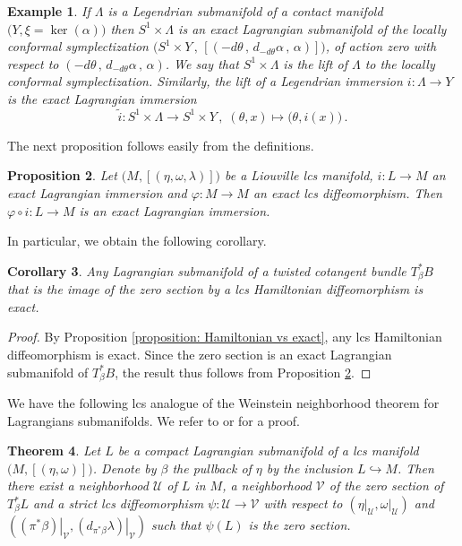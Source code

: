 \documentclass{amsart}
\newtheorem{thm}{Theorem}[section]
\newtheorem{prop}[thm]{Proposition}
\newtheorem{cor}[thm]{Corollary}
\newtheorem{example}[thm]{Example}
\theoremstyle{remark}
\begin{document}
\begin{example}\label{example: lift of Legendrians to symplectization}
If $\Lambda$ is a Legendrian submanifold
of a contact manifold $\big(Y, \xi = \ker (\alpha) \big)$
then $S^1 \times \Lambda$ is an exact Lagrangian submanifold
of the locally conformal symplectization
$\big(S^1 \times Y \,,\, [(-d\theta \,,\, d_{-d\theta}\alpha \,,\, \alpha)]\big)$,
of action zero with respect to $(-d\theta \,,\, d_{-d\theta}\alpha \,,\, \alpha)$.
We say that $S^1 \times \Lambda$
is the lift of $\Lambda$
to the locally conformal symplectization.
Similarly,
the lift of a Legendrian immersion
$i: \Lambda \rightarrow Y$
is the exact Lagrangian immersion
\[
\widetilde{i}: S^1 \times \Lambda \rightarrow S^1 \times Y \,,\;
(\theta, x) \mapsto \big( \theta, i(x) \big) \,.
\]
\end{example}

The next proposition follows easily from the definitions.

\begin{prop}\label{proposition: image of exact by exact}
Let $\big( M, [(\eta, \omega, \lambda)]\big)$ be a Liouville lcs manifold,
$i: L \rightarrow M$ an exact Lagrangian immersion
and $\varphi: M \rightarrow M$ an exact lcs diffeomorphism.
Then $\varphi \circ i: L \rightarrow M$
is an exact Lagrangian immersion.
\end{prop}

In particular,
we obtain the following corollary.

\begin{cor}\label{corollary: image of zero section is exact}
Any Lagrangian submanifold of a twisted cotangent bundle $T^{\ast}_{\beta}B$
that is the image of the zero section by a lcs Hamiltonian diffeomorphism
is exact.
\end{cor}

\begin{proof}
By Proposition \ref{proposition: Hamiltonian vs exact},
any lcs Hamiltonian diffeomorphism is exact.
Since the zero section is an exact Lagrangian submanifold of $T^{\ast}_{\beta}B$,
the result thus follows from Proposition \ref{proposition: image of exact by exact}.
\end{proof}

We have the following lcs analogue
of the Weinstein neighborhood theorem for Lagrangians submanifolds.
We refer to \cite[Theorem 3.2]{OS} or \cite[Theorem 2.11]{CM}
for a proof.

\begin{thm}\label{theorem: Weinstein}
Let $L$ be a compact Lagrangian submanifold
of a lcs manifold $\big( M, [(\eta, \omega)] \big)$.
Denote by $\beta$ the pullback of $\eta$
by the inclusion $L \hookrightarrow M$.
Then there exist a neighborhood $\mathcal{U}$ of $L$ in $M$,
a neighborhood $\mathcal{V}$ of the zero section of $T^{\ast}_{\beta}L$
and a strict lcs diffeomorphism $\psi: \mathcal{U} \rightarrow \mathcal{V}$
with respect to 
$( \left. \eta \right\lvert_{\mathcal{U}} , \left. \omega \right\lvert_{\mathcal{U}} )$
and $( \left. (\pi^{\ast}\beta) \right\lvert_{\mathcal{V}} ,
\left. (d_{\pi^{\ast}\beta}\lambda) \right\lvert_{\mathcal{V}} )$
such that $\psi(L)$ is the zero section.
\end{thm}
\end{document}
